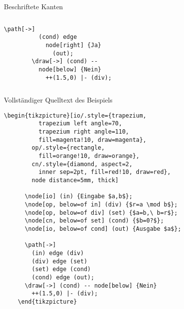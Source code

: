 \begin{Frame}[t,fragile]{Beschriftete Kanten}
  \xxx\xxx
  \begin{columns}[T]
    \column{35mm}
    \column{50mm}
      \xxx
      \begin{lstlisting}[gobble=8]
        \path[->]
          (cond) edge
            node[right] {Ja}
              (out);
        \draw[->] (cond) --
          node[below] {Nein}
            ++(1.5,0) |- (div);
      \end{lstlisting}
  \end{columns}
\end{Frame}

\begin{Frame}{Vollständiger Quelltext des Beispiels}
  \begin{lstlisting}[gobble=4]
    \begin{tikzpicture}[io/.style={trapezium,
          trapezium left angle=70,
          trapezium right angle=110,
          fill=magenta!10, draw=magenta},
        op/.style={rectangle,
          fill=orange!10, draw=orange},
        cn/.style={diamond, aspect=2,
          inner sep=2pt, fill=red!10, draw=red},
        node distance=5mm, thick]

      \node[io] (in) {Eingabe $a,b$};
      \node[op, below=of in] (div) {$r=a \mod b$};
      \node[op, below=of div] (set) {$a=b,\ b=r$};
      \node[cn, below=of set] (cond) {$b=0?$};
      \node[io, below=of cond] (out) {Ausgabe $a$};

      \path[->]
        (in) edge (div)
        (div) edge (set)
        (set) edge (cond)
        (cond) edge (out);
      \draw[->] (cond) -- node[below] {Nein}
        ++(1.5,0) |- (div);
    \end{tikzpicture}
  \end{lstlisting}
\end{Frame}

